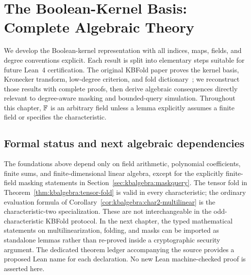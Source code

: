 \section{The Boolean-Kernel Basis: Complete Algebraic Theory}\label{sec:kbalgebra}

We develop the Boolean-kernel representation with all indices, maps, fields, and degree conventions explicit. Each result is split into elementary steps suitable for future Lean~4 certification. The original KBFold paper proves the kernel basis, Kronecker transform, low-degree criterion, and fold dictionary~\cite{MkhidaKBFold2026}; we reconstruct those results with complete proofs, then derive algebraic consequences directly relevant to degree-aware masking and bounded-query simulation. Throughout this chapter, $\mathbb{F}$ is an arbitrary field unless a lemma explicitly assumes a finite field or specifies the characteristic.










\subsection{Formal status and next algebraic dependencies}\label{sec:kbalgebra:status}
The foundations above depend only on field arithmetic, polynomial coefficients, finite sums, and finite-dimensional linear algebra, except for the explicitly finite-field masking statements in Section~\ref{sec:kbalgebra:maskquery}. The tensor fold in Theorem~\ref{thm:kbalgebra:tensor-fold} is valid in every characteristic; the ordinary evaluation formula of Corollary~\ref{cor:kbalgebra:char2-multilinear} is the characteristic-two specialization. These are not interchangeable in the odd-characteristic KBFold protocol. In the next chapter, the typed mathematical statements on multilinearization, folding, and masks can be imported as standalone lemmas rather than re-proved inside a cryptographic security argument. The dedicated theorem ledger accompanying the source provides a proposed Lean name for each declaration. No new Lean machine-checked proof is asserted here.
